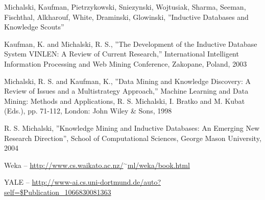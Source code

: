 \begin{thebibliography}{99}
 {Michalski, Kaufman, Pietrzykowski, Sniezynski,
    Wojtusiak, Sharma, Seeman, Fischthal, Alkharouf, White, Draminski,
    Glowinski, ''Inductive Databases and Knowledge Scouts''}

 {Kaufman, K. and Michalski, R. S., ''The Development
    of the Inductive Database System VINLEN: A Review of Current
    Research,'' International Intelligent Information Processing and
    Web Mining Conference, Zakopane, Poland, 2003}

 {Michalski, R. S. and Kaufman, K., ''Data Mining and
    Knowledge Discovery: A Review of Issues and a Multistrategy
    Approach,'' Machine Learning and Data Mining: Methods and
    Applications, R. S. Michalski, I. Bratko and M.  Kubat (Eds.), pp.
    71-112, London: John Wiley \& Sons, 1998}

 {R. S. Michalski, ''Knowledge Mining and Inductive
    Databases: An Emerging New Research Direction'', School of
    Computational Sciences, George Mason University, 2004}
    
 Weka -- \href{http://www.cs.waikato.ac.nz/~ml/weka/book.html}{http://www.cs.waikato.ac.nz/$^{\sim}$ml/weka/book.html}

 YALE -- \href{http://www-ai.cs.uni-dortmund.de/auto?self=$Publication_1066830081363}{http://www-ai.cs.uni-dortmund.de/auto?self=\$Publication\_1066830081363}

\end{thebibliography}